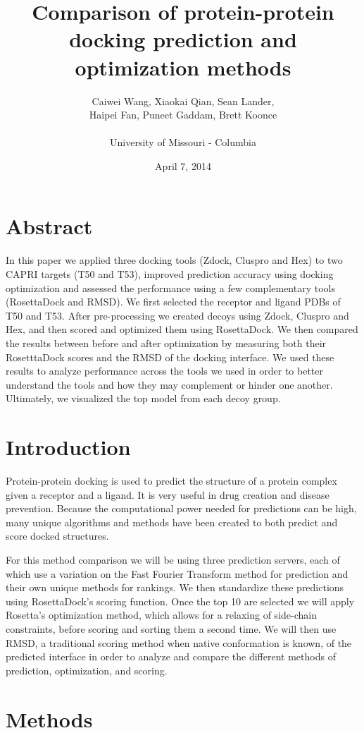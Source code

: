 \documentclass{article}
\title{Comparison of protein-protein docking prediction and optimization methods}
\author{Caiwei Wang, Xiaokai Qian, Sean Lander, \\Haipei Fan, Puneet Gaddam, Brett Koonce\\\\University of Missouri - Columbia}
\date{April 7, 2014}
\begin{document}
\maketitle

\section{Abstract}

In this paper we applied three docking tools (Zdock, Cluspro and Hex) to two CAPRI targets (T50 and T53), improved prediction accuracy using docking optimization and assessed the performance using a few complementary tools (RosettaDock and RMSD). We first selected the receptor and ligand PDBs of T50 and T53. After pre-processing we created decoys using Zdock, Cluspro and Hex, and then scored and optimized them using RosettaDock. We then compared the results between before and after optimization by measuring both their RosetttaDock scores and the RMSD of the docking interface. We used these results to analyze performance across the tools we used in order to better understand the tools and how they may complement or hinder one another. Ultimately, we visualized the top model from each decoy group.

\section{Introduction}

Protein-protein docking is used to predict the structure of a protein complex given a receptor and a ligand. It is very useful in drug creation and disease prevention. Because the computational power needed for predictions can be high, many unique algorithms and methods have been created to both predict and score docked structures.

For this method comparison we will be using three prediction servers, each of which use a variation on the Fast Fourier Transform method for prediction and their own unique methods for rankings. We then standardize these predictions using RosettaDock's scoring function. Once the top 10 are selected we will apply Rosetta's optimization method, which allows for a relaxing of side-chain constraints, before scoring and sorting them a second time. We will then use RMSD, a traditional scoring method when native conformation is known, of the predicted interface in order to analyze and compare the different methods of prediction, optimization, and scoring.

\section{Methods}
\end{document}
